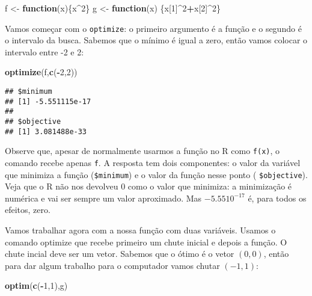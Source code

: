 \documentclass[]{book}
\newenvironment{Shaded}{\begin{snugshade}}{\end{snugshade}}
\newcommand{\KeywordTok}[1]{\textcolor[rgb]{0.13,0.29,0.53}{\textbf{#1}}}
\newcommand{\DecValTok}[1]{\textcolor[rgb]{0.00,0.00,0.81}{#1}}
\newcommand{\StringTok}[1]{\textcolor[rgb]{0.31,0.60,0.02}{#1}}
\newcommand{\ControlFlowTok}[1]{\textcolor[rgb]{0.13,0.29,0.53}{\textbf{#1}}}
\newcommand{\OperatorTok}[1]{\textcolor[rgb]{0.81,0.36,0.00}{\textbf{#1}}}
\newcommand{\NormalTok}[1]{#1}
\begin{document}
\begin{Shaded}
\begin{Highlighting}[]
\NormalTok{f <-}\StringTok{ }\ControlFlowTok{function}\NormalTok{(x)\{x}\OperatorTok{^}\DecValTok{2}\NormalTok{\}}
\NormalTok{g <-}\StringTok{ }\ControlFlowTok{function}\NormalTok{(x) \{x[}\DecValTok{1}\NormalTok{]}\OperatorTok{^}\DecValTok{2}\OperatorTok{+}\NormalTok{x[}\DecValTok{2}\NormalTok{]}\OperatorTok{^}\DecValTok{2}\NormalTok{\}}
\end{Highlighting}
\end{Shaded}

Vamos começar com o \texttt{optimize}: o primeiro argumento é a função e
o segundo é o intervalo da busca. Sabemos que o mínimo é igual a zero,
então vamos colocar o intervalo entre -2 e 2:

\begin{Shaded}
\begin{Highlighting}[]
\KeywordTok{optimize}\NormalTok{(f,}\KeywordTok{c}\NormalTok{(}\OperatorTok{-}\DecValTok{2}\NormalTok{,}\DecValTok{2}\NormalTok{))}
\end{Highlighting}
\end{Shaded}

\begin{verbatim}
## $minimum
## [1] -5.551115e-17
## 
## $objective
## [1] 3.081488e-33
\end{verbatim}

Observe que, apesar de normalmente usarmos a função no R como
\texttt{f(x)}, o comando recebe apenas \texttt{f}. A resposta tem dois
componentes: o valor da variável que minimiza a função
(\texttt{\$minimum}) e o valor da função nesse ponto (
\texttt{\$objective}). Veja que o R não nos devolveu 0 como o valor que
minimiza: a minimização é numérica e vai ser sempre um valor aproximado.
Mas \(-5.55 10^{-17}\) é, para todos os efeitos, zero.

Vamos trabalhar agora com a nossa função com duas variáveis. Usamos o
comando optimize que recebe primeiro um chute inicial e depois a função.
O chute incial deve ser um vetor. Sabemos que o ótimo é o vetor
\((0,0)\), então para dar algum trabalho para o computador vamos chutar
\((-1,1)\):

\begin{Shaded}
\begin{Highlighting}[]
\KeywordTok{optim}\NormalTok{(}\KeywordTok{c}\NormalTok{(}\OperatorTok{-}\DecValTok{1}\NormalTok{,}\DecValTok{1}\NormalTok{),g)}
\end{Highlighting}
\end{Shaded}
\end{document}
